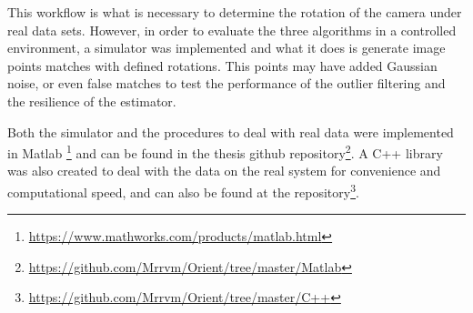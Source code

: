 This workflow is what is necessary to determine the rotation of the camera under real data sets. However, in order to evaluate the three algorithms in a controlled environment, a simulator was implemented and what it does is generate image points matches with defined rotations. This points may have added Gaussian noise, or even false matches to test the performance of the outlier filtering and the resilience of the estimator. 

Both the simulator and the procedures to deal with real data were implemented in Matlab \footnote{\href{https://www.mathworks.com/products/matlab.html}{https://www.mathworks.com/products/matlab.html}} and can be found in the thesis github repository\footnote{\href{https://github.com/Mrrvm/Orient/tree/master/Matlab}{https://github.com/Mrrvm/Orient/tree/master/Matlab}}. A C++ library was also created to deal with the data on the real system for convenience and computational speed, and can also be found at the repository\footnote{\href{https://github.com/Mrrvm/Orient/tree/master/C++}{https://github.com/Mrrvm/Orient/tree/master/C++}}.

